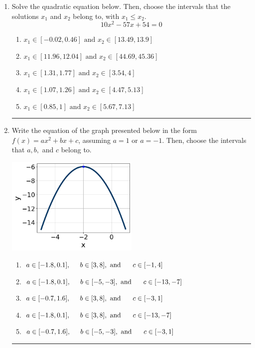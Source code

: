 \documentclass[14pt]{extbook}
\newcommand{\litem}[1]{\item#1\hspace*{-1cm}\rule{\textwidth}{0.4pt}}
\begin{document}
\begin{enumerate}
{\begin{enumerate}[label=\Alph*.]
\end{enumerate} }
\litem{
Solve the quadratic equation below. Then, choose the intervals that the solutions $x_1$ and $x_2$ belong to, with $x_1 \leq x_2$.\[ 10x^{2} -57 x + 54 = 0 \]\begin{enumerate}[label=\Alph*.]
\item \( x_1 \in [-0.02, 0.46] \text{ and } x_2 \in [13.49, 13.9] \)
\item \( x_1 \in [11.96, 12.04] \text{ and } x_2 \in [44.69, 45.36] \)
\item \( x_1 \in [1.31, 1.77] \text{ and } x_2 \in [3.54, 4] \)
\item \( x_1 \in [1.07, 1.26] \text{ and } x_2 \in [4.47, 5.13] \)
\item \( x_1 \in [0.85, 1] \text{ and } x_2 \in [5.67, 7.13] \)

\end{enumerate} }
\litem{
Write the equation of the graph presented below in the form $f(x)=ax^2+bx+c$, assuming  $a=1$ or $a=-1$. Then, choose the intervals that $a, b,$ and $c$ belong to.
\begin{center}
    \includegraphics[width=0.5\textwidth]{../Figures/quadraticGraphToEquationB.png}
\end{center}
\begin{enumerate}[label=\Alph*.]
\item \( a \in [-1.8, 0.1], \hspace*{5mm} b \in [3, 8], \text{ and } \hspace*{5mm} c \in [-1, 4] \)
\item \( a \in [-1.8, 0.1], \hspace*{5mm} b \in [-5, -3], \text{ and } \hspace*{5mm} c \in [-13, -7] \)
\item \( a \in [-0.7, 1.6], \hspace*{5mm} b \in [3, 8], \text{ and } \hspace*{5mm} c \in [-3, 1] \)
\item \( a \in [-1.8, 0.1], \hspace*{5mm} b \in [3, 8], \text{ and } \hspace*{5mm} c \in [-13, -7] \)
\item \( a \in [-0.7, 1.6], \hspace*{5mm} b \in [-5, -3], \text{ and } \hspace*{5mm} c \in [-3, 1] \)


\end{enumerate}}
\end{enumerate}
\end{document}
